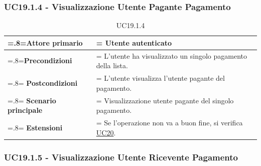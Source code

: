         \subsubsection{UC19.1.4 - Visualizzazione Utente Pagante Pagamento}
        \label{UC19.1.4}

            \begin{table}[H]
                \centering
                \renewcommand{\arraystretch}{1.8}
                \renewcommand\tabularxcolumn[1]{m{#1}}
                \begin{tabularx}{0.9\textwidth} {
                    >{\hsize=.8\hsize\linewidth=\hsize}X
                    >{\hsize=1.2\hsize\linewidth=\hsize}X}
                    \hline
                    \textbf{Attore primario} & Utente autenticato \\
                    \hline
                    \textbf{Precondizioni} & L'utente ha visualizzato un singolo pagamento della lista. \\
                    \hline
                    \textbf{Postcondizioni} & L'utente visualizza l'utente pagante del pagamento. \\
                    \hline
                    \textbf{Scenario principale} & Visualizzazione utente pagante del singolo pagamento. \\
                    \hline
                    \textbf{Estensioni} & Se l'operazione non va a buon fine, si verifica \hyperref[UC20]{UC20}. \\
                    \hline
                \end{tabularx}
                \caption{UC19.1.4}
            \end{table}

        \subsubsection{UC19.1.5 - Visualizzazione Utente Ricevente Pagamento}
        \label{UC19.1.5}

